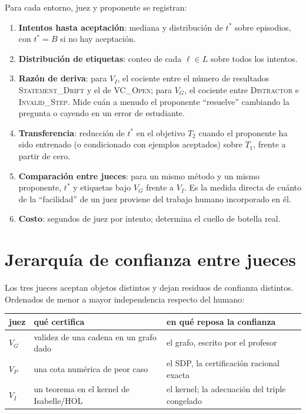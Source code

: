 \documentclass[11pt,a4paper]{article}
\begin{document}
Para cada entorno, juez y proponente se registran:
\begin{enumerate}
  \item \textbf{Intentos hasta aceptación}: mediana y distribución de $t^*$ sobre episodios, con $t^* = B$ si no hay aceptación.
  \item \textbf{Distribución de etiquetas}: conteo de cada $\ell \in L$ sobre todos los intentos.
  \item \textbf{Razón de deriva}: para $V_I$, el cociente entre el número de resultados \textsc{Statement\_Drift} y el de \textsc{VC\_Open}; para $V_G$, el cociente entre \textsc{Distractor} e \textsc{Invalid\_Step}. Mide cuán a menudo el proponente ``resuelve'' cambiando la pregunta o cayendo en un error de estudiante.
  \item \textbf{Transferencia}: reducción de $t^*$ en el objetivo $T_2$ cuando el proponente ha sido entrenado (o condicionado con ejemplos aceptados) sobre $T_1$, frente a partir de cero.
  \item \textbf{Comparación entre jueces}: para un mismo método y un mismo proponente, $t^*$ y etiquetas bajo $V_G$ frente a $V_I$. Es la medida directa de cuánto de la ``facilidad'' de un juez proviene del trabajo humano incorporado en él.
  \item \textbf{Costo}: segundos de juez por intento; determina el cuello de botella real.
\end{enumerate}

\section{Jerarquía de confianza entre jueces}

Los tres jueces aceptan objetos distintos y dejan residuos de confianza distintos. Ordenados de menor a mayor independencia respecto del humano:

\begin{center}
\begin{tabular}{@{}lll@{}}
\toprule
juez & qué certifica & en qué reposa la confianza \\
\midrule
$V_G$ & validez de una cadena en un grafo dado & el grafo, escrito por el profesor \\
$V_P$ & una cota numérica de peor caso & el SDP, la certificación racional exacta \\
$V_I$ & un teorema en el kernel de Isabelle/HOL & el kernel; la adecuación del triple congelado \\
\bottomrule
\end{tabular}
\end{center}
\end{document}

